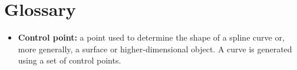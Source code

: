 \section{Glossary} \label{App:AppendixG}
\begin{itemize}
\item \textbf{Control point:}  a point used to determine the shape of a spline curve or, more generally, a surface or higher-dimensional object. A curve is generated using a set of control points.
\end{itemize}
